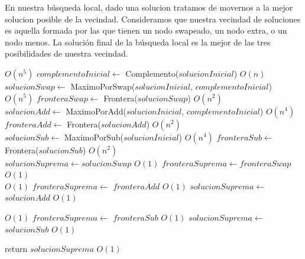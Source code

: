 En nuestra búsqueda local, dado una solucion tratamos de movernos a la mejor solucion posible de la vecindad. Consideramos que nuestra vecindad de soluciones es aquella formada por las que tienen un nodo swapeado, un nodo extra, o un nodo menos. La solución final de la búsqueda local es la mejor de las tres posibilidades de nuestra vecindad. \\

\begin{algorithm}[H]
\begin{algorithmic}
             \Comment $O(n^5)$
    \State $complementoInicial \gets$ Complemento($solucionInicial$) \Comment $O(n)$\\

    \State $solucionSwap \gets$ MaximoPorSwap($solucionInicial$, $complementoInicial$)  \Comment $O(n^5)$
    \State $fronteraSwap \gets$ Frontera($solucionSwap$)                                \Comment $O(n^2)$ \\

    \State $solucionAdd \gets$ MaximoPorAdd($solucionInicial$, $complementoInicial$)    \Comment $O(n^4)$
    \State $fronteraAdd \gets$ Frontera($solucionAdd$)                                  \Comment $O(n^2)$\\

    \State $solucionSub \gets$ MaximoPorSub($solucionInicial$)      \Comment $O(n^4)$
    \State $fronteraSub \gets$ Frontera($solucionSub$)              \Comment $O(n^2)$\\

    \State $solucionSuprema \gets solucionSwap$ \Comment $O(1)$
    \State $fronteraSuprema \gets fronteraSwap$ \Comment $O(1)$\\

                    \Comment $O(1)$
        \State $fronteraSuprema \gets$ $fronteraAdd$    \Comment $O(1)$
        \State $solucionSuprema \gets$ $solucionAdd$    \Comment $O(1)$\\
    \EndIf

                    \Comment $O(1)$
        \State $fronteraSuprema \gets$ $fronteraSub$    \Comment $O(1)$
        \State $solucionSuprema \gets$ $solucionSub$    \Comment $O(1)$\\
    \EndIf

    \State return $solucionSuprema$                     \Comment $O(1)$
\EndFunction

\end{algorithmic}
\end{algorithm}

